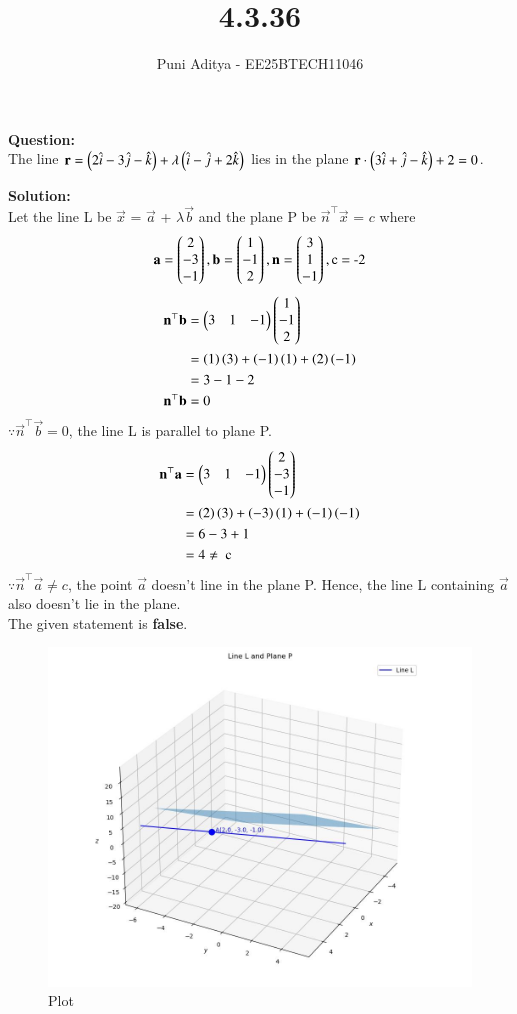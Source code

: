 \documentclass[journal]{IEEEtran}
\begin{document}
\title{4.3.36}
\author{Puni Aditya - EE25BTECH11046}
\maketitle
\textbf{Question:}\\
The line $\mathbf{r} = \left(2\hat{i} - 3\hat{j} - \hat{k}\right) + \lambda\left(\hat{i} - \hat{j} + 2\hat{k}\right)$ lies in the plane $\mathbf{r} \cdot \left(3\hat{i} + \hat{j} - \hat{k}\right) + 2 = 0$.

\textbf{Solution:}\\
Let the line L be $\vec{x}$ = $\vec{a}$ + $\lambda\vec{b}$ and the plane P be $\vec{n}^\top\vec{x}$ = $c$ where
\begin{align*}
    \mathbf{a} = \begin{pmatrix}2 \\ -3 \\ -1\end{pmatrix}, \mathbf{b} = \begin{pmatrix}1 \\ -1 \\ 2\end{pmatrix}, \mathbf{n} = \begin{pmatrix}3 \\ 1 \\ -1\end{pmatrix}, \text{c = -2}
\end{align*}
\begin{align}
    \mathbf{n}^\top\mathbf{b} &= \begin{pmatrix}3 & 1 & -1\end{pmatrix}\begin{pmatrix}1 \\ -1 \\ 2\end{pmatrix} \\
    &= \left(1\right)\left(3\right)+\left(-1\right)\left(1\right)+\left(2\right)\left(-1\right) \\
    &= 3-1-2 \\
    \mathbf{n}^\top\mathbf{b} &= 0
\end{align}
$\because \vec{n}^\top\vec{b} = 0$, the line L is parallel to plane P.
\begin{align}
    \mathbf{n}^\top\mathbf{a} &= \begin{pmatrix}3 & 1 & -1\end{pmatrix}\begin{pmatrix}2 \\ -3 \\ -1\end{pmatrix} \\
    &= \left(2\right)\left(3\right) + \left(-3\right)\left(1\right) + \left(-1\right)\left(-1\right) \\
    &= 6-3+1 \\
    &= 4 \neq \text{ c}
\end{align}
$\because \vec{n}^\top\vec{a} \neq c$, the point $\vec{a}$ doesn't line in the plane P. Hence, the line L containing $\vec{a}$ also doesn't lie in the plane. \\
The given statement is \textbf{false}.

\begin{figure}
    \centering
    \includegraphics[width=\columnwidth]{figs/plot_c.jpg}
    \caption*{Plot}
    \label{fig:fig}
\end{figure}
\end{document}
